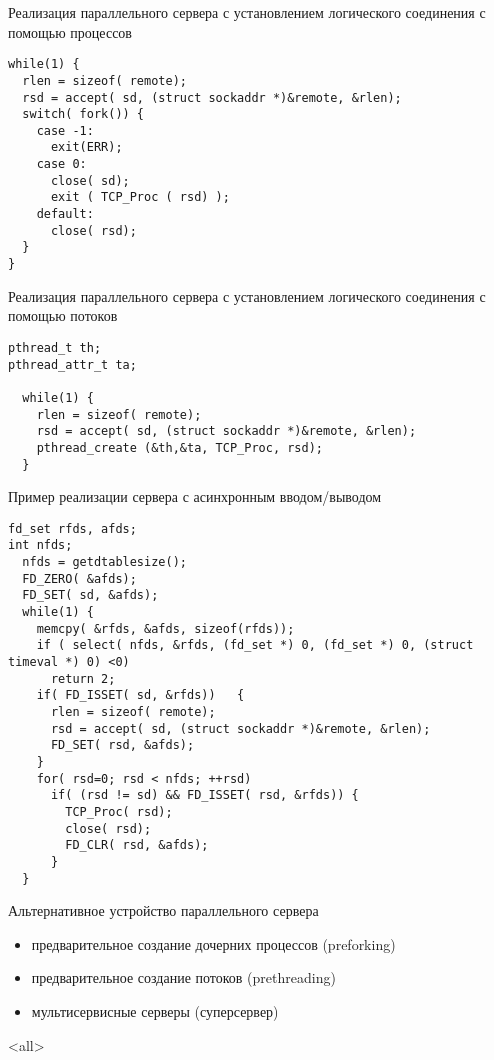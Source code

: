 \begin{frame}[fragile]{Реализация параллельного сервера с установлением логического соединения с помощью процессов}
	\scriptsize	
\begin{lstlisting}[Language=C]
while(1) {
  rlen = sizeof( remote);
  rsd = accept( sd, (struct sockaddr *)&remote, &rlen);
  switch( fork()) {
    case -1:
      exit(ERR);
    case 0:
      close( sd);
      exit ( TCP_Proc ( rsd) );
    default:
      close( rsd);
  }
}
\end{lstlisting}
	\normalsize

\end{frame}

\begin{frame}[fragile]{Реализация параллельного сервера с установлением логического соединения с помощью потоков}
	\scriptsize	
\begin{lstlisting}[Language=C]
pthread_t th;
pthread_attr_t ta;

  while(1) {
    rlen = sizeof( remote);
    rsd = accept( sd, (struct sockaddr *)&remote, &rlen);
    pthread_create (&th,&ta, TCP_Proc, rsd);
  }
\end{lstlisting}
	\normalsize
\end{frame}

\begin{frame}[fragile]{Пример реализации сервера с асинхронным вводом/выводом}
	\scriptsize
\begin{lstlisting}[Language=C]
fd_set rfds, afds;
int nfds;
  nfds = getdtablesize();
  FD_ZERO( &afds);
  FD_SET( sd, &afds);
  while(1) {
    memcpy( &rfds, &afds, sizeof(rfds));	
    if ( select( nfds, &rfds, (fd_set *) 0, (fd_set *) 0, (struct timeval *) 0) <0)
      return 2;
    if( FD_ISSET( sd, &rfds))	{
      rlen = sizeof( remote);
      rsd = accept( sd, (struct sockaddr *)&remote, &rlen);
      FD_SET( rsd, &afds);
    }
    for( rsd=0; rsd < nfds; ++rsd)
      if( (rsd != sd) && FD_ISSET( rsd, &rfds)) {
        TCP_Proc( rsd);
        close( rsd);
        FD_CLR( rsd, &afds);
      }
  }
\end{lstlisting}
	\normalsize

\end{frame}


\begin{frame}{Альтернативное устройство параллельного сервера}

	\begin{itemize}
		\item предварительное создание дочерних процессов (preforking)
		\item предварительное создание потоков (prethreading)
		\item мультисервисные серверы (суперсервер)
	\end{itemize}
\end{frame}
\mode<all>{}


